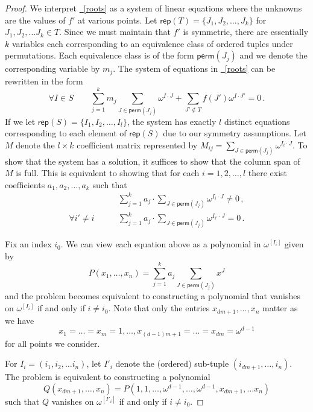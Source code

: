 \documentclass[11pt]{article}
\numberwithin{equation}{section}
\theoremstyle{definition}
\theoremstyle{plain}
\newcommand{\expeqref}[2]{\hyperref[#2]{#1~\eqref{#2}}}
\theoremstyle{definition}
\newcommand\perm{\textsf{perm}}
\newcommand\rep{\textsf{rep}}
\begin{document}
\begin{proof}

We interpret \expeqref{}{roots} as a system of linear equations where the unknowns are the values of $f'$ at various points.  Let $\rep(T) = \{J_1, J_2, \dots , J_k \}$ for $J_1, J_2, \dots J_k \in T$.  Since we must maintain that $f'$ is symmetric, there are essentially $k$ variables each corresponding to an equivalence class of ordered tuples under permutations.  Each equivalence class is of the form $\perm(J_j)$ and we denote the corresponding variable by $m_j$.  The system of equations in \expeqref{}{roots} can be rewritten in the form
\[    %
%
\forall I \in S\qquad 
\sum_{j=1}^k m_j \sum_{J \in \perm(J_j)} \omega^{I \cdot J} + \sum_{J' \notin T}f(J') \omega^{I \cdot J'} = 0 \,.
\]
If we let  $\rep(S) = \{ I_1, I_2, \dots , I_l\}$, the system has exactly $l$ distinct equations corresponding to each element of $\rep(S)$ due to our symmetry assumptions.  Let $M$ denote the $l \times k$ coefficient matrix represented by $M_{ij} = \sum_{J \in \perm(J_j)} \omega^{I_i \cdot J}$.  To show that the system has a solution, it suffices to show that the column span of $M$ is full.  This is equivalent to showing that for each $i = 1,2, \dots, l$ there exist coefficients $a_1,a_2, \dots ,a_k$ such that
%
\begin{align*}
& \sum_{j=1}^{k} a_j \cdot\sum_{J \in \perm(J_j)} \omega^{I_i \cdot J}  \neq 0\,,  \\
\forall i' \neq i \qquad
& \sum_{j=1}^{k} a_j \cdot\sum_{J \in \perm(J_j)} \omega^{I_{i'} \cdot J} =0  \,.
\end{align*}
%
%
%

Fix an index $i_0$.  We can view each equation above as a polynomial in $\omega^{[I_{i}]}$ given by 
\[
P(x_1, \dots ,x_n) = \sum_{j=1}^k a_j \sum_{J \in \perm(J_j)} x^J
\]
and the problem becomes equivalent to constructing a polynomial that vanishes on $\omega^{[I_{i}]}$ if and only if $i \neq i_0$.  Note that only the entries $x_{dm+1}, \dots , x_n$ matter as we have \[x_1 = \dots = x_m = 1, \dots , x_{(d-1)m+1} = \dots = x_{dm} = \omega^{d-1}\] for all points we consider.

For $I_i = (i_1, i_2, \dots i_n)$, let $I'_i$ denote the (ordered) sub-tuple $(i_{dm+1}, \dots , i_n)$.  The problem is equivalent to constructing a polynomial  
\[
Q(x_{dm+1}, \dots ,x_n) = P(1,1, \dots, \omega^{d-1}, \dots, \omega^{d-1}, x_{dm+1}, \dots x_n)
\]
such that $Q$ vanishes on $\omega^{[I'_{i}]}$ if and only if $i \neq i_0$.



\end{proof}
\end{document}
